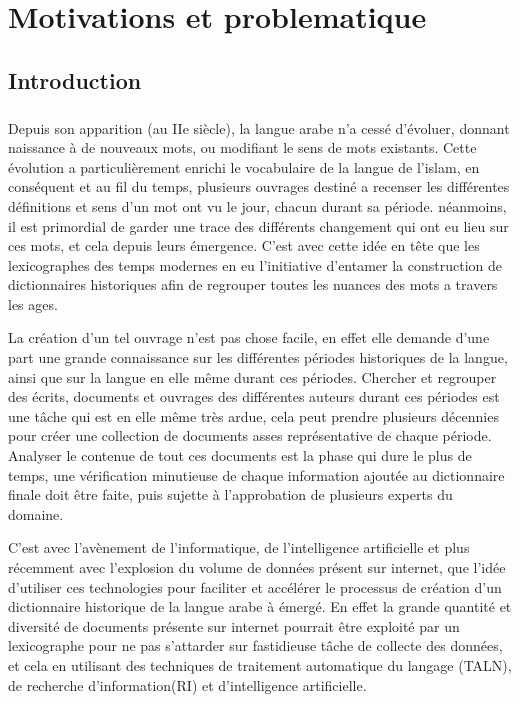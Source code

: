 \documentclass[]{report}
\begin{document}


 

\tableofcontents

\listoffigures
	
\chapter{Motivations et problematique}
	\section{Introduction}
		\paragraph{}
		Depuis son apparition (au IIe siècle), la langue arabe n'a cessé d'évoluer, donnant naissance à de nouveaux mots, ou modifiant le sens de mots existants. Cette évolution a particulièrement enrichi le vocabulaire de la langue de l'islam, en conséquent et au fil du temps, plusieurs ouvrages destiné a recenser les différentes définitions et sens d'un mot ont vu le jour, chacun durant sa période. néanmoins,  il est primordial de garder une trace des différents changement qui ont eu lieu sur ces mots, et cela depuis leurs émergence. C'est avec cette idée en tête que les lexicographes des temps modernes en eu l'initiative d'entamer la construction de dictionnaires historiques afin de regrouper toutes les nuances des mots a travers les ages.
		\par
		La création d'un tel ouvrage n'est pas chose facile, en effet elle demande d'une part une grande connaissance sur les différentes périodes historiques de la langue, ainsi que sur la langue en elle même durant ces périodes. Chercher et regrouper des écrits, documents et ouvrages des différentes auteurs durant ces périodes est une tâche qui est en elle même très ardue, cela peut prendre plusieurs décennies pour créer une collection de documents asses représentative de chaque période. Analyser le contenue de tout ces documents est la phase qui dure le plus de temps, une vérification minutieuse de chaque information ajoutée au dictionnaire finale doit être faite, puis sujette à l'approbation de plusieurs experts du domaine.
		\par
		C'est avec l'avènement de l'informatique, de l'intelligence artificielle et plus récemment avec l'explosion du volume de données présent sur internet, que l'idée d'utiliser ces technologies pour faciliter et accélérer le processus de création d'un dictionnaire historique de la langue arabe à émergé. En effet la grande quantité et diversité de documents présente sur internet pourrait être exploité par un lexicographe pour ne pas s'attarder sur fastidieuse tâche de collecte des données, et cela en utilisant des techniques de traitement automatique du langage (TALN), de recherche d'information(RI) et d'intelligence artificielle.
\end{document}
